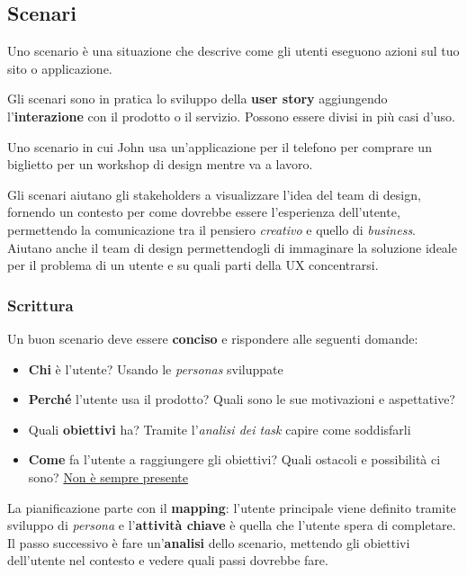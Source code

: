 \subsection{Scenari}
\begin{definition}[Scenario]
	Uno scenario è una situazione che descrive come gli utenti eseguono azioni sul tuo sito o applicazione.
\end{definition}
Gli scenari sono in pratica lo sviluppo della \textbf{user story} aggiungendo l'\textbf{interazione} con il prodotto o il servizio. Possono essere divisi in più casi d'uso.
\begin{example}
	Uno scenario in cui John usa un'applicazione per il telefono per comprare un biglietto per un workshop di design mentre va a lavoro.
\end{example}

Gli scenari aiutano gli stakeholders a visualizzare l'idea del team di design, fornendo un contesto per come dovrebbe essere l'esperienza dell'utente, permettendo la comunicazione tra il pensiero \textit{creativo} e quello di \textit{business}. Aiutano anche il team di design permettendogli di immaginare la soluzione ideale per il problema di un utente e su quali parti della UX concentrarsi.

\subsubsection{Scrittura}
Un buon scenario deve essere \textbf{conciso} e rispondere alle seguenti domande:
\begin{itemize}
	\item \textbf{Chi} è l'utente? Usando le \textit{personas} sviluppate
	\item \textbf{Perché} l'utente usa il prodotto? Quali sono le sue motivazioni e aspettative?
	\item Quali \textbf{obiettivi} ha? Tramite l'\textit{analisi dei task} capire come soddisfarli
	\item \textbf{Come} fa l'utente a raggiungere gli obiettivi? Quali ostacoli e possibilità ci sono? \underline{Non è sempre presente}
\end{itemize}

La pianificazione parte con il \textbf{mapping}: l'utente principale viene definito tramite sviluppo di \textit{persona} e l'\textbf{attività chiave} è quella che l'utente spera di completare. Il passo successivo è fare un'\textbf{analisi} dello scenario, mettendo gli obiettivi dell'utente nel contesto e vedere quali passi dovrebbe fare.

